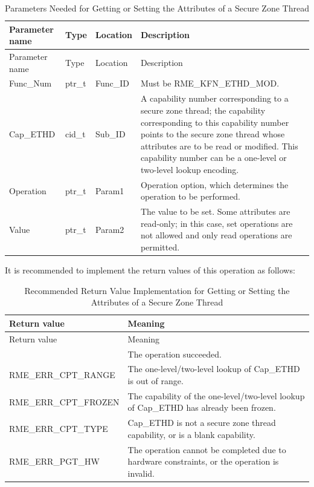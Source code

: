 \begin{xltabular}{\textwidth}{@{}>{\hsize\raggedright\arraybackslash}X>{\hsize\raggedright\arraybackslash}X>{\hsize\raggedright\arraybackslash}X>{\hsize\raggedright\arraybackslash}X@{}}
\caption{Parameters Needed for Getting or Setting the Attributes of a Secure Zone Thread}\label{tab:8-104-get-or-set-enclave-thread-attributes-parameters}\\
\toprule
Parameter name & Type & Location & Description\tabularnewline
\endfirsthead
\toprule
Parameter name & Type & Location & Description\tabularnewline
\midrule
\endhead
\bottomrule
\endlastfoot
Func\_Num & ptr\_t & Func\_ID &
Must be RME\_KFN\_ETHD\_MOD.\tabularnewline
Cap\_ETHD & cid\_t & Sub\_ID &
A capability number corresponding to a secure zone thread; the capability corresponding to this capability number points to the secure zone thread whose attributes are to be read or modified. This capability number can be a one-level or two-level lookup encoding.\tabularnewline
Operation & ptr\_t & Param1 &
Operation option, which determines the operation to be performed.\tabularnewline
Value & ptr\_t & Param2 &
The value to be set. Some attributes are read-only; in this case, set operations are not allowed and only read operations are permitted.\tabularnewline
\end{xltabular}
\nopagebreak[4]

It is recommended to implement the return values of this operation as follows:

\begin{xltabular}{\textwidth}{@{}>{\hsize\raggedright\arraybackslash}X>{\hsize\raggedright\arraybackslash}X@{}}
\caption{Recommended Return Value Implementation for Getting or Setting the Attributes of a Secure Zone Thread}\label{tab:8-105-get-or-set-enclave-thread-attributes-suggested-return-values}\\
\toprule
Return value & Meaning\tabularnewline
\endfirsthead
\toprule
Return value & Meaning\tabularnewline
\midrule
\endhead
\bottomrule
{} & The operation succeeded.\tabularnewline
    RME\_ERR\_CPT\_RANGE & The one-level/two-level lookup of Cap\_ETHD is out of range.\tabularnewline
    RME\_ERR\_CPT\_FROZEN & The capability of the one-level/two-level lookup of Cap\_ETHD has already been frozen.\tabularnewline
    RME\_ERR\_CPT\_TYPE & Cap\_ETHD is not a secure zone thread capability, or is a blank capability.\tabularnewline
    
    RME\_ERR\_PGT\_HW & The operation cannot be completed due to hardware constraints, or the operation is invalid.\tabularnewline
\end{xltabular}
\nopagebreak[4]

